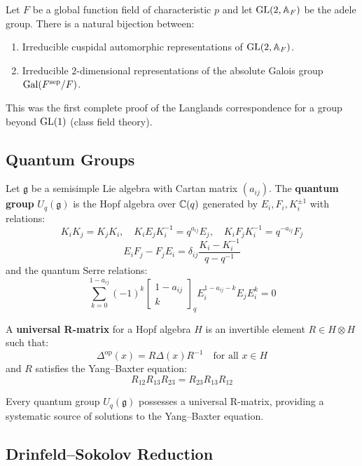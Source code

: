 \begin{theorem}[Drinfeld, 1974]
Let $F$ be a global function field of characteristic $p$ and let $\operatorname{GL}(2, \mathbb{A}_F)$ be the adele group. There is a natural bijection between:
\begin{enumerate}
    \item Irreducible cuspidal automorphic representations of $\operatorname{GL}(2, \mathbb{A}_F)$.
    \item Irreducible $2$-dimensional representations of the absolute Galois group $\operatorname{Gal}(F^{\mathrm{sep}}/F)$.
\end{enumerate}
\end{theorem}

This was the first complete proof of the Langlands correspondence for a group beyond $\operatorname{GL}(1)$ (class field theory).

\subsection{Quantum Groups}

\begin{definition}
Let $\mathfrak{g}$ be a semisimple Lie algebra with Cartan matrix $(a_{ij})$. The \textbf{quantum group} $U_q(\mathfrak{g})$ is the Hopf algebra over $\mathbb{C}(q)$ generated by $E_i, F_i, K_i^{\pm 1}$ with relations:
\[
K_i K_j = K_j K_i, \quad K_i E_j K_i^{-1} = q^{a_{ij}} E_j, \quad K_i F_j K_i^{-1} = q^{-a_{ij}} F_j
\]
\[
E_i F_j - F_j E_i = \delta_{ij} \frac{K_i - K_i^{-1}}{q - q^{-1}}
\]
and the quantum Serre relations:
\[
\sum_{k=0}^{1-a_{ij}} (-1)^k \left[\begin{matrix} 1-a_{ij} \\ k \end{matrix}\right]_q E_i^{1-a_{ij}-k} E_j E_i^k = 0
\]
\end{definition}

\begin{definition}
A \textbf{universal R-matrix} for a Hopf algebra $H$ is an invertible element $R \in H \otimes H$ such that:
\[
\Delta^{\mathrm{op}}(x) = R \Delta(x) R^{-1} \quad \text{for all } x \in H
\]
and $R$ satisfies the Yang--Baxter equation:
\[
R_{12} R_{13} R_{23} = R_{23} R_{13} R_{12}
\]
\end{definition}

Every quantum group $U_q(\mathfrak{g})$ possesses a universal R-matrix, providing a systematic source of solutions to the Yang--Baxter equation.

\subsection{Drinfeld--Sokolov Reduction}

